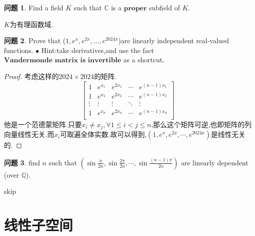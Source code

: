 \documentclass[11pt]{ctexart}
\theoremstyle{definition}
\newtheorem{qqq}{问题}[section]
\numberwithin{equation}{section}
\begin{document}
\begin{qqq}
    Find a field $K$ such that $\mathbb{C}$ is a $\mathbf{proper}$ subfield of $K$.
\end{qqq}
\begin{aaa}
    $K$为有理函数域.
\end{aaa}
\begin{qqq}
    Prove that ($1,e^x,e^{2x},...,e^{2024x}$)are linearly independent real-valued functions.
    \newline
    $\bullet$ Hint:take derivatives,and use the fact $\textbf{Vandermonde matrix is invertible}$ as a shortcut.
\end{qqq}
\begin{proof}
    考虑这样的$2024\times 2024$的矩阵.
    $$
    \begin{bmatrix*}
        1 & e^{x_1} & e^{2x_1} & \cdots & e^{(n-1)x_1} \\
        1 & e^{x_2} & e^{2x_2} & \cdots & e^{(n-1)x_2} \\
        \vdots & \vdots & \vdots & \ddots & \vdots \\
        1 & e^{x_n} & e^{2x_n} & \cdots & e^{(n-1)x_n}\\
    \end{bmatrix*}
    $$
    他是一个范德蒙矩阵.只要$x_i \neq x_j, \forall 1 \leq i < j \leq n$,那么这个矩阵可逆,也即矩阵的列向量线性无关.而$x_i$可取遍全体实数.故可以得到,$(1,e^x,e^{2x},\cdots ,e^{2024x})$是线性无关的.
\end{proof}
\begin{qqq}
    find $n$ such that $(\sin \frac{\pi}{2n},\sin \frac{2\pi}{2n},\cdots ,\sin \frac{(n-1)\pi}{2n})$ are linearly dependent (over $\mathbb{Q}$).
\end{qqq}
\begin{aaa}
    skip
\end{aaa}


\section{线性子空间}
\end{document}
